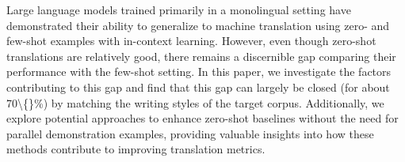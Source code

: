 Large language models trained primarily in a monolingual setting have demonstrated their ability to generalize to machine translation using zero- and few-shot examples with in-context learning. However, even though zero-shot translations are relatively good, there remains a discernible gap comparing their performance with the few-shot setting. In this paper, we investigate the factors contributing to this gap and find that this gap can largely be closed (for about 70\textbackslash\{\}\%) by matching the writing styles of the target corpus. Additionally, we explore potential approaches to enhance zero-shot baselines without the need for parallel demonstration examples, providing valuable insights into how these methods contribute to improving translation metrics.